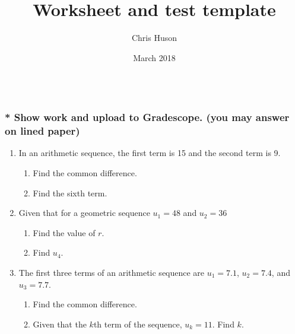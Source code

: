 \documentclass[12pt, oneside]{article}
\title{Worksheet and test template}
\author{Chris Huson}
\date{March 2018}
\begin{document}
\subsubsection*{\\* Show work and upload to Gradescope. (you may answer on lined paper)}

\begin{enumerate}

\item In an arithmetic sequence, the first term is 15 and the second term is 9.
\begin{enumerate}
    \item Find the common difference. \vspace{2cm}
    \item Find the sixth term.
\end{enumerate} \vspace{2cm}

\item Given that for a geometric sequence $u_1=48$ and $u_2=36$
\begin{enumerate}
    \item Find the value of $r$. \vspace{2cm}
    \item Find $u_4$. 
\end{enumerate} \vspace{2cm}

\item The first three terms of an arithmetic sequence are $u_1=7.1$, $u_2=7.4$, and $u_3=7.7$.
\begin{enumerate}
    \item Find the common difference. \vspace{2cm}
    \item Given that the $k$th term of the sequence, $u_k=11$. Find $k$.
\end{enumerate}



\end{enumerate}
\end{document}
